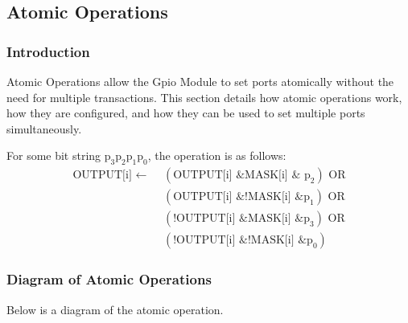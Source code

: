 \subsection{Atomic Operations}

\subsubsection{Introduction}
Atomic Operations allow the Gpio Module to set ports atomically without the need for multiple transactions. This section details how atomic operations work, how they are configured, and how they can be used to set multiple ports simultaneously.

For some bit string $\text{p}_3\text{p}_2\text{p}_1\text{p}_0$, the operation is as follows:
\begin{equation*}
  \begin{split}
    \text{OUTPUT[i] }\leftarrow\text{ }&(\text{OUTPUT[i]} \text{ \& } \text{MASK[i]} \text{ \& } \text{ p}_2) \text{ OR} \\
                        &(\text{OUTPUT[i]} \text{ \& } \text{!MASK[i]} \text{ \& } \text{p}_1) \text{ OR}\\
                        &(\text{!OUTPUT[i]} \text{ \& } \text{MASK[i]} \text{ \& } \text{p}_3) \text{ OR}\\
                        &(\text{!OUTPUT[i]} \text{ \& } \text{!MASK[i]} \text{ \& } \text{p}_0)
  \end{split}
\end{equation*}

\subsubsection{Diagram of Atomic Operations}
Below is a diagram of the atomic operation.

